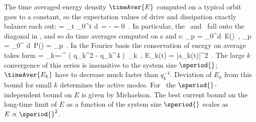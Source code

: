 The time averaged energy density  $\timeAver{E}$
computed on a typical orbit goes to a constant, so
the expectation values  of drive and dissipation
exactly balance each out:
\beq
      =
    \lim_{t\rightarrow \infty}
         \int_0^t d\tau \, \dot{\expctE}
=
       - 
= 0
    \,.
In particular, the \eqva\
and \reqva\ fall onto the diagonal in  ,
and so do time averages computed on \po s and \rpo s:
\beq
{}_p =
 \int_0^{}d\tau \, E(\tau)
    \,,\qquad
{}_p =
 \int_0^{} d\tau \, P(\tau)
    =
      _p
    \,.
\label{poE}
\eeq
In the Fourier basis  the conservation of energy on average
takes form
 = \sum_{k=-\infty}^{\infty} ( q_k^2 - q_k^4 )\,
    _k
\,,\qquad
E_k(t) =  {\textstyle{}} |a_k(t)|^2
\,.
The large $k$ convergence of this series is insensitive to the
system size $\speriod{}$; $\timeAver{E_k}$ have to decrease much faster than
$q_k^{-4}$.
Deviation of $E_k$ from this bound for small $k$ determines the active modes.
For \eqva\ the $\speriod{}$-independent bound
    on $E$ is given by Michaelson.
The best current bound on the long-time limit
of $E$
as a function of the system size $\speriod{}$ scales as
$E \propto \speriod{}^2$.
